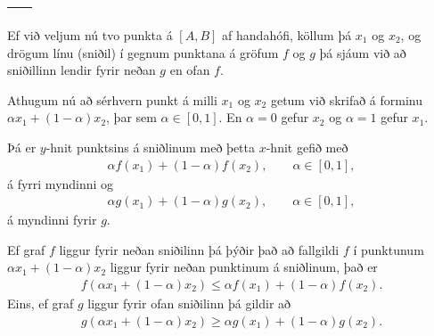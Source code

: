 \documentclass[a4paper,10pt,icelandic]{sphinxmanual}
\begin{document}
\begin{savenotes}\sphinxattablestart
\centering
\begin{tabulary}{\linewidth}[t]{|T|T|}
\hline
{}\label{\detokenize{kafli05:figa2}}
&\label{\detokenize{kafli05:figb2}}
\\
\hline
\end{tabulary}
\par
\sphinxattableend\end{savenotes}

Ef við veljum nú tvo punkta á \([A,B]\) af handahófi, köllum þá
\(x_1\) og \(x_2\), og drögum línu (sniðil) í gegnum punktana á
gröfum \(f\) og \(g\) þá sjáum við að sniðillinn lendir fyrir
neðan \(g\) en ofan \(f\).

Athugum nú að sérhvern punkt á milli \(x_1\) og \(x_2\) getum við skrifað á
forminu
\(\alpha x_1 + (1-\alpha)x_2\), þar sem \(\alpha \in [0,1]\). En \(\alpha=0\)
gefur \(x_2\) og \(\alpha=1\) gefur \(x_1\).

Þá er
\(y\)-hnit punktsins á sniðlinum með þetta \(x\)-hnit gefið með
\begin{equation*}
\begin{split}\alpha f(x_1) + (1-\alpha) f(x_2), \qquad \alpha \in [0,1],\end{split}
\end{equation*}
á fyrri myndinni og
\begin{equation*}
\begin{split}\alpha g(x_1) + (1-\alpha) g(x_2), \qquad \alpha \in [0,1],\end{split}
\end{equation*}
á myndinni fyrir \(g\).

Ef graf \(f\) liggur fyrir neðan sniðilinn þá þýðir það að fallgildi
\(f\) í punktunum \(\alpha x_1 + (1-\alpha)x_2\) liggur fyrir
neðan punktinum á sniðlinum, það er
\begin{equation*}
\begin{split}f(\alpha x_1+(1-\alpha)x_2)\leq \alpha f(x_1)+(1-\alpha)f(x_2).\end{split}
\end{equation*}
Eins, ef graf \(g\) liggur fyrir ofan sniðilinn þá gildir að
\begin{equation*}
\begin{split}g(\alpha x_1+(1-\alpha)x_2)\geq \alpha g(x_1)+(1-\alpha)g(x_2).\end{split}
\end{equation*}
\end{document}
